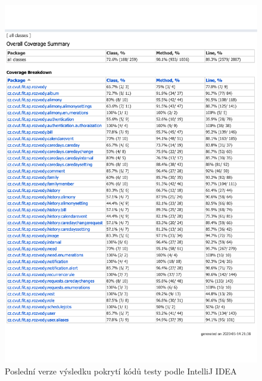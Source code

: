     \begin{figure}\centering
	    \includegraphics[width=1.0\textwidth]{pdfs/IntelliJ-IDEA-coverage-runner-results}
	    \caption[Pokrytí kódů testy podle JaCoCo]{Poslední verze výsledku pokrytí kódů testy podle IntelliJ IDEA}\label{image:intellij-coverage-result}
    \end{figure}